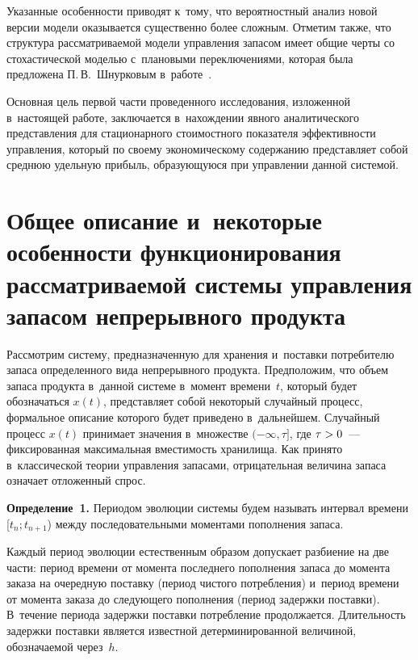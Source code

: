 \begin{multicols}{2}
  Указанные особенности приводят к~тому, что вероятностный анализ новой 
версии модели оказывается существенно более сложным. Отметим также, что 
структура рассматриваемой модели управ\-ле\-ния запасом имеет общие черты со 
стохастической моделью с~плановыми переключениями, которая была 
пред\-ло\-же\-на П.\,В.~Шнурковым в~работе~\cite{7-sh}.
  
  Основная цель первой части проведенного исследования, изложенной 
в~настоящей работе, заключается в~нахождении явного аналитического 
представления для стационарного стоимостного показателя эффективности 
управления, который по своему экономическому содержанию пред\-став\-ля\-ет 
собой среднюю удельную прибыль, обра\-зу\-ющу\-юся при управ\-ле\-нии данной 
системой. 

\section{Общее описание и~некоторые особенности 
функционирования рассматриваемой системы управления запасом 
непрерывного продукта}
  
  Рассмотрим систему, предназначенную для хранения и~поставки 
потребителю запаса определенного вида непрерывного продукта. 
Предположим, что объем запаса продукта в~данной системе в~момент 
времени~$t$, который будет обозначаться $x(t)$, представляет собой 
некоторый случайный процесс, формальное описание которого будет 
приведено в~дальнейшем. Случайный процесс $x(t)$ принимает значения 
в~множестве $(-\infty,\tau]$, где $\tau\hm>0$~--- фиксированная максимальная 
вместимость хранилища. Как принято в~классической теории управления 
запасами, отрицательная величина запаса означает отложенный спрос.
  
  \smallskip
  
  \noindent
  \textbf{Определение~1.} Периодом эволюции системы будем называть 
интервал времени [$t_n;t_{n+1}$) между последовательными моментами 
пополнения запаса. 
  
  \smallskip
  
  Каждый период эволюции естественным образом допускает разбиение на две 
части: период времени от момента последнего пополнения запаса до момента 
заказа на очередную поставку (период чис\-то\-го потребления) и~период времени 
от момента заказа до следующего пополнения (период задержки поставки). 
В~течение периода задержки поставки потребление продолжается. 
Длительность задержки поставки является известной детерминированной 
величиной, обозначаемой через~$h$.
  

\end{multicols}

